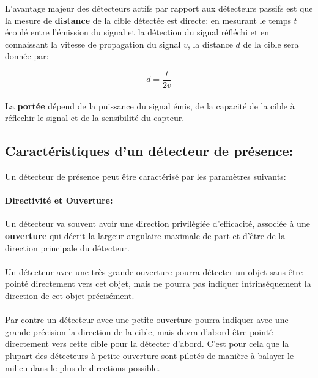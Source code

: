 \documentclass[12pt,a4paper]{report}
\begin{document}
L'avantage majeur des détecteurs actifs par rapport aux détecteurs passifs est que la mesure de \textbf{distance} de la cible détectée est directe: en mesurant le temps $t$ écoulé entre l'émission du signal et la détection du signal réfléchi et en connaissant la vitesse de propagation du signal $v$, la distance $d$ de la cible sera donnée par:

\begin{equation}
	d = \frac{t}{2v}
\end{equation}

\paragraph{} La \textbf{portée} dépend de la puissance du signal émis, de la capacité de la cible à réflechir le signal et de la sensibilité du capteur.

\subsection{Caractéristiques d'un détecteur de présence:} Un détecteur de présence peut être caractérisé par les paramètres suivants:

\paragraph{Directivité et Ouverture:} Un détecteur va souvent avoir une direction privilégiée d'efficacité, associée à une \textbf{ouverture} qui décrit la largeur angulaire maximale de part et d'être de la direction principale du détecteur.

\paragraph{} Un détecteur avec une très grande ouverture pourra détecter un objet sans être pointé directement vers cet objet, mais ne pourra pas indiquer intrinséquement la direction de cet objet précisément.

\paragraph{} Par contre un détecteur avec une petite ouverture pourra indiquer avec une grande précision la direction de la cible, mais devra d'abord être pointé directement vers cette cible pour la détecter d'abord. C'est pour cela que la plupart des détecteurs à petite ouverture sont pilotés de manière à balayer le milieu dans le plus de directions possible.
\end{document}
